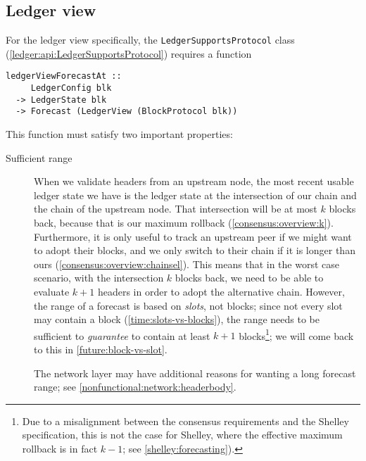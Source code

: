 \subsection{Ledger view}
\label{forecast:ledgerview}

For the ledger view specifically, the \lstinline!LedgerSupportsProtocol!
class (\cref{ledger:api:LedgerSupportsProtocol}) requires a function
%
\begin{lstlisting}
ledgerViewForecastAt ::
     LedgerConfig blk
  -> LedgerState blk
  -> Forecast (LedgerView (BlockProtocol blk))
\end{lstlisting}
%
This function must satisfy two important properties:
%
\begin{description}
\item[Sufficient range]

When we validate headers from an upstream node, the most recent usable ledger
state we have is the ledger state at the intersection of our chain and the chain
of the upstream node. That intersection will be at most $k$ blocks back, because
that is our maximum rollback (\cref{consensus:overview:k}). Furthermore, it is
only useful to track an upstream peer if we might want to adopt their blocks,
and we only switch to their chain if it is longer than ours
(\cref{consensus:overview:chainsel}). This means that in the worst case
scenario, with the intersection $k$ blocks back, we need to be able to evaluate
$k + 1$ headers in order to adopt the alternative chain. However, the range of a
forecast is based on \emph{slots}, not blocks; since not every slot may contain
a block (\cref{time:slots-vs-blocks}), the range needs to be sufficient to
\emph{guarantee} to contain at least $k + 1$ blocks\footnote{Due to a
misalignment between the consensus requirements and the Shelley specification,
this is not the case for Shelley, where the effective maximum rollback is in
fact $k - 1$; see \cref{shelley:forecasting}).}; we will come back to this in
\cref{future:block-vs-slot}.

The network layer may have additional reasons for wanting a long forecast
range; see \cref{nonfunctional:network:headerbody}.


\end{description}
